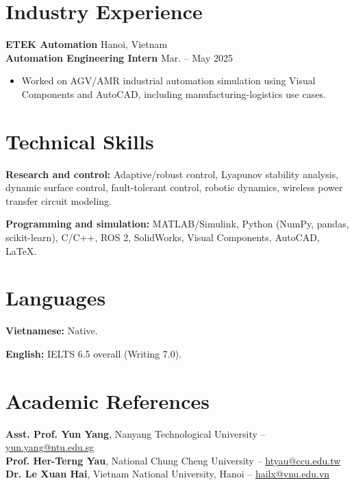 \documentclass[11pt,a4paper]{article}
\newenvironment{expbullets}{\begin{itemize}[leftmargin=0.52cm,topsep=3pt,itemsep=2.3pt,parsep=0pt,partopsep=0pt,label={\textperiodcentered}]}{\end{itemize}}
\newcommand{\skillrow}[2]{\par\noindent\hspace*{0.22cm}\textbf{#1} #2\par\vspace{3pt}}
\begin{document}
\section{Industry Experience}
\noindent\hspace*{0.22cm}\textbf{ETEK Automation} \hfill Hanoi, Vietnam\\[-1pt]
\hspace*{0.22cm}\textbf{Automation Engineering Intern} \hfill Mar. -- May 2025\par
\begin{expbullets}
  \item Worked on AGV/AMR industrial automation simulation using Visual Components and AutoCAD, including manufacturing-logistics use cases.
\end{expbullets}

\section{Technical Skills}
\skillrow{Research and control:}{Adaptive/robust control, Lyapunov stability analysis, dynamic surface control, fault-tolerant control, robotic dynamics, wireless power transfer circuit modeling.}
\skillrow{Programming and simulation:}{MATLAB/Simulink, Python (NumPy, pandas, scikit-learn), C/C++, ROS 2, SolidWorks, Visual Components, AutoCAD, \LaTeX.}

\section{Languages}
\skillrow{Vietnamese:}{Native.}
\skillrow{English:}{IELTS 6.5 overall (Writing 7.0).}

\section{Academic References}
\noindent\hspace*{0.22cm}\textbf{Asst. Prof. Yun Yang}, Nanyang Technological University -- \href{mailto:yun.yang@ntu.edu.sg}{yun.yang@ntu.edu.sg}\\[2pt]
\hspace*{0.22cm}\textbf{Prof. Her-Terng Yau}, National Chung Cheng University -- \href{mailto:htyau@ccu.edu.tw}{htyau@ccu.edu.tw}\\[2pt]
\hspace*{0.22cm}\textbf{Dr. Le Xuan Hai}, Vietnam National University, Hanoi -- \href{mailto:hailx@vnu.edu.vn}{hailx@vnu.edu.vn}
\end{document}
